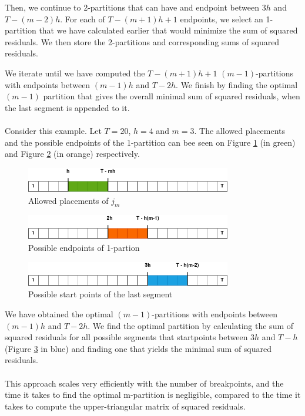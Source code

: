 \documentclass[main.tex]{subfiles}
\begin{document}
Then, we continue to 2-partitions that can have and endpoint between $3h$ and
$T - (m-2)h$. For each of $T - (m + 1)h + 1$ endpoints, we select an
1-partition that we have calculated earlier that would minimize the sum of
squared residuals. We then store the 2-partitions and corresponding sums of
squared residuals.

We iterate until we have computed the $T - (m + 1)h + 1$
$(m-1)$-partitions with endpoints between $(m-1)h$ and $T-2h$.
We finish by finding the optimal $(m-1)$ partition that gives the overall
minimal sum of squared residuals, when the last segment is appended to it.\\\\
Consider this example. Let $T=20$, $h=4$ and $m=3$. The allowed placements
and the possible endpoints of the 1-partition can bee seen on Figure \ref{plt_4_1} (in
green) and Figure \ref{plt_4_2} (in orange) respectively. 
\begin{figure}[H]
  \centering
  \includegraphics[width=0.8\textwidth]{imgs/breakpoints1}
  \caption{Allowed placements of $j_m$}
  \label{plt_4_1}
\end{figure}
\begin{figure}[H]
  \centering
  \includegraphics[width=0.8\textwidth]{imgs/breakpoints2}
  \caption{Possible endpoints of 1-partion}
  \label{plt_4_2}
\end{figure}
\begin{figure}[H]
  \centering
  \includegraphics[width=0.8\textwidth]{imgs/breakpoints3}
  \caption{Possible start points of the last segment}
  \label{plt_4_3}
\end{figure}
We have obtained the optimal $(m - 1)$-partitions with endpoints between
$(m - 1)h$
and $T - 2h$. We find the optimal partition by calculating the sum of squared
residuals for all possible segments that startpoints between $3h$ and $T - h$
(Figure \ref{plt_4_3} in blue) and finding one that yields the minimal sum of
squared residuals.\\\\
This approach scales very efficiently with the number of breakpoints,
and the time it takes to find the optimal m-partition is negligible, compared to
the time it takes to compute the upper-triangular matrix of squared residuals.
\end{document}
